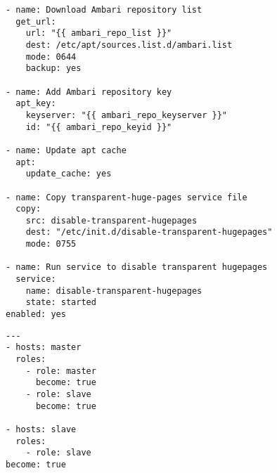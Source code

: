\begin{lstlisting}[caption={Common tasks in Ansible}, label={lst:commontasks}]
- name: Download Ambari repository list
  get_url:
    url: "{{ ambari_repo_list }}"
    dest: /etc/apt/sources.list.d/ambari.list
    mode: 0644
    backup: yes

- name: Add Ambari repository key
  apt_key:
    keyserver: "{{ ambari_repo_keyserver }}"
    id: "{{ ambari_repo_keyid }}"

- name: Update apt cache
  apt:
    update_cache: yes

- name: Copy transparent-huge-pages service file
  copy:
    src: disable-transparent-hugepages
    dest: "/etc/init.d/disable-transparent-hugepages"
    mode: 0755

- name: Run service to disable transparent hugepages
  service:
    name: disable-transparent-hugepages
    state: started
enabled: yes
\end{lstlisting}


\lstset{language=sh}
\begin{lstlisting}[caption={Ansible playbook that gets run to install the cluster system}, label={lst:allplaybook}]
---
- hosts: master
  roles:
    - role: master
      become: true
    - role: slave
      become: true

- hosts: slave
  roles:
    - role: slave
become: true
\end{lstlisting}